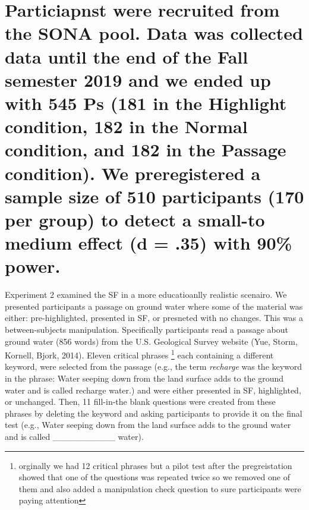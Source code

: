 \documentclass[]{article}
\begin{document}
\hypertarget{particiapnst-were-recruited-from-the-sona-pool.-data-was-collected-data-until-the-end-of-the-fall-semester-2019-and-we-ended-up-with-545-ps-181-in-the-highlight-condition-182-in-the-normal-condition-and-182-in-the-passage-condition.-we-preregistered-a-sample-size-of-510-participants-170-per-group-to-detect-a-small-to-medium-effect-d-.35-with-90-power.}{%
\section{Particiapnst were recruited from the SONA pool. Data was
collected data until the end of the Fall semester 2019 and we ended up
with 545 Ps (181 in the Highlight condition, 182 in the Normal
condition, and 182 in the Passage condition). We preregistered a sample
size of 510 participants (170 per group) to detect a small-to medium
effect (d = .35) with 90\%
power.}\label{particiapnst-were-recruited-from-the-sona-pool.-data-was-collected-data-until-the-end-of-the-fall-semester-2019-and-we-ended-up-with-545-ps-181-in-the-highlight-condition-182-in-the-normal-condition-and-182-in-the-passage-condition.-we-preregistered-a-sample-size-of-510-participants-170-per-group-to-detect-a-small-to-medium-effect-d-.35-with-90-power.}}

Experiment 2 examined the SF in a more educatioanlly realistic scenairo.
We presented participants a passage on ground water where some of the
material was either: pre-highlighted, presented in SF, or presneted with
no changes. This was a between-subjects manipulation. Specifically
participants read a passage about ground water (856 words) from the U.S.
Geological Survey website (Yue, Storm, Kornell, Bjork, 2014). Eleven
critical phrases \footnote{orginally we had 12 critical phrases but a
  pilot test after the pregreistation showed that one of the questions
  was repeated twice so we removed one of them and also added a
  manipulation check question to sure participants were paying attention}
each containing a different keyword, were selected from the passage
(e.g., the term \emph{recharge} was the keyword in the phrase: Water
seeping down from the land surface adds to the ground water and is
called recharge water.) and were either presented in SF, highlighted, or
unchanged. Then, 11 fill-in-the blank questions were created from these
phrases by deleting the keyword and asking participants to provide it on
the final test (e.g., Water seeping down from the land surface adds to
the ground water and is called \_\_\_\_\_\_\_\_\_\_ water).
\end{document}
